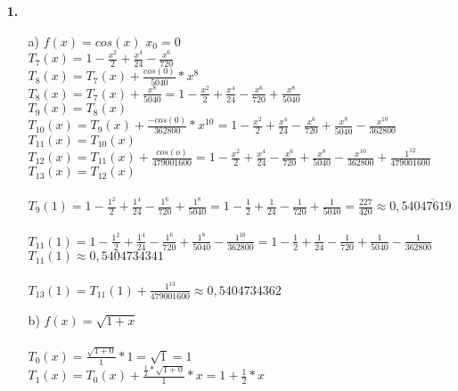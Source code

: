 \documentclass[a4paper,11pt,fleqn]{scrartcl}
\author{\authorinfo}
\title{\titleinfo}
\date{\today}
\begin{document}
\maketitle
\begin{enumerate}
    
\item[\textbf{1.}]

	\begin{enumerate}
		\item[{a)}]
			 $f(x)=cos(x)$ 
			 $x_0=0$ \\
			 $T_7(x)=1-\frac{x^2}{2}+\frac{x^4}{24}-\frac{x^6}{720}$ \\
			 $T_8(x)=T_7(x)+\frac{cos(0)}{5040}*x^8$\\
			 $T_8(x)=T_7(x)+\frac{x^8}{5040}=1-\frac{x^2}{2}+\frac{x^4}{24}-\frac{x^6}{720}+\frac{x^8}{5040}$\\
			 $T_9(x)=T_8(x)$\\
			 $T_{10}(x)=T_9(x)+\frac{-cos(0)}{362800}*x^10=1-\frac{x^2}{2}+\frac{x^4}{24}-\frac{x^6}{720}+\frac{x^8}{5040}-\frac{x^10}{362800}$\\
			 $T_{11}(x)=T_{10}(x)$\\
			 $T_{12}(x)=T_{11}(x)+\frac{cos(o)}{479001600}=1-\frac{x^2}{2}+\frac{x^4}{24}-\frac{x^6}{720}+\frac{x^8}{5040}-\frac{x^{10}}{362800}+\frac{1^{12}}{479001600}$\\
			 $T_{13}(x)=T_{12}(x)$\\ \\
			 $T_9(1)=1-\frac{1^2}{2}+\frac{1^4}{24}-\frac{1^6}{720}+\frac{1^8}{5040}
			 =1-\frac{1}{2}+\frac{1}{24}-\frac{1}{720}+\frac{1}{5040}=\frac{227}{420} 
			 \approx 0,54\overline{047619}$\\ \\
			 $T_{11}(1)=1-\frac{1^2}{2}+\frac{1^4}{24}-\frac{1^6}{720}+\frac{1^8}{5040}-\frac{1^{10}}{362800}
			 =1-\frac{1}{2}+\frac{1}{24}-\frac{1}{720}+\frac{1}{5040}-\frac{1}{362800}$ \\
			 $T_{11}(1) \approx 0,5404734341$ \\ \\
			 $T_{13}(1)=T_{11}(1)+\frac{1^{13}}{479001600} \approx 0,5404734362$\\
		\item[b)]
			$f(x)=\sqrt{1+x}$\\ \\
			$T_0(x)=\frac{\sqrt{1+0}}{1}*1=\sqrt{1}=1$\\
			$T_1(x)=T_0(x)+\frac{\frac{1}{2}*\sqrt{1+0}}{1}*x=1+\frac{1}{2}*x$\\

\end{enumerate}
\end{enumerate}
\end{document}
